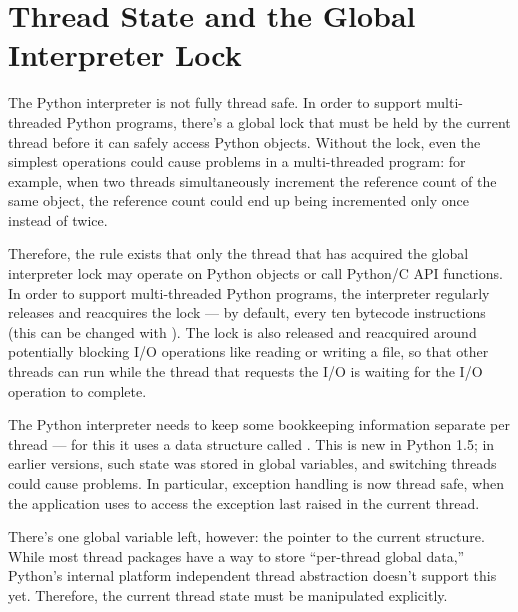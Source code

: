 \documentclass{manual}
\begin{document}

\section{Thread State and the Global Interpreter Lock
         \label{threads}}


The Python interpreter is not fully thread safe.  In order to support
multi-threaded Python programs, there's a global lock that must be
held by the current thread before it can safely access Python objects.
Without the lock, even the simplest operations could cause problems in
a multi-threaded program: for example, when two threads simultaneously
increment the reference count of the same object, the reference count
could end up being incremented only once instead of twice.

Therefore, the rule exists that only the thread that has acquired the
global interpreter lock may operate on Python objects or call Python/C
API functions.  In order to support multi-threaded Python programs,
the interpreter regularly releases and reacquires the lock --- by
default, every ten bytecode instructions (this can be changed with
).  The lock is also released and
reacquired around potentially blocking I/O operations like reading or
writing a file, so that other threads can run while the thread that
requests the I/O is waiting for the I/O operation to complete.

The Python interpreter needs to keep some bookkeeping information
separate per thread --- for this it uses a data structure called
.  This is new in Python
1.5; in earlier versions, such state was stored in global variables,
and switching threads could cause problems.  In particular, exception
handling is now thread safe, when the application uses
 to access the exception last raised in the
current thread.

There's one global variable left, however: the pointer to the current
 structure.  While most
thread packages have a way to store ``per-thread global data,''
Python's internal platform independent thread abstraction doesn't
support this yet.  Therefore, the current thread state must be
manipulated explicitly.
\end{document}
